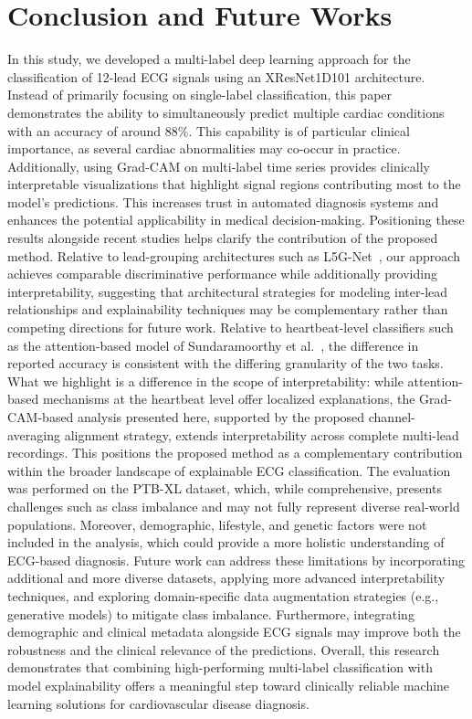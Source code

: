 \documentclass[a4paper,fleqn]{cas-dc}
\begin{document}
\section{Conclusion and Future Works}
\label{sec:conclusion}
In this study, we developed a multi-label deep learning approach for the classification of 12-lead ECG signals using an XResNet1D101 architecture. Instead of primarily focusing on single-label classification, this paper demonstrates the ability to simultaneously predict multiple cardiac conditions with an accuracy of around 88\%. This capability is of particular clinical importance, as several cardiac abnormalities may co-occur in practice. Additionally, using Grad-CAM on multi-label time series provides clinically interpretable visualizations that highlight signal regions contributing most to the model's predictions. This increases trust in automated diagnosis systems and enhances the potential applicability in medical decision-making. Positioning these results alongside recent studies helps clarify the contribution of the proposed method. Relative to lead-grouping architectures such as L5G-Net~\cite{yang2025lead}, our approach achieves comparable discriminative performance while additionally providing interpretability, suggesting that architectural strategies for modeling inter-lead relationships and explainability techniques may be complementary rather than competing directions for future work. Relative to heartbeat-level classifiers such as the attention-based model of Sundaramoorthy et al.~\cite{sundaramoorthy2026explainable}, the difference in reported accuracy is consistent with the differing granularity of the two tasks. What we highlight is a difference in the scope of interpretability: while attention-based mechanisms at the heartbeat level offer localized explanations, the Grad-CAM-based analysis presented here, supported by the proposed channel-averaging alignment strategy, extends interpretability across complete multi-lead recordings. This positions the proposed method as a complementary contribution within the broader landscape of explainable ECG classification. The evaluation was performed on the PTB-XL dataset, which, while comprehensive, presents challenges such as class imbalance and may not fully represent diverse real-world populations. Moreover, demographic, lifestyle, and genetic factors were not included in the analysis, which could provide a more holistic understanding of ECG-based diagnosis. Future work can address these limitations by incorporating additional and more diverse datasets, applying more advanced interpretability techniques, and exploring domain-specific data augmentation strategies (e.g., generative models) to mitigate class imbalance. Furthermore, integrating demographic and clinical metadata alongside ECG signals may improve both the robustness and the clinical relevance of the predictions. Overall, this research demonstrates that combining high-performing multi-label classification with model explainability offers a meaningful step toward clinically reliable machine learning solutions for cardiovascular disease diagnosis.
\end{document}
